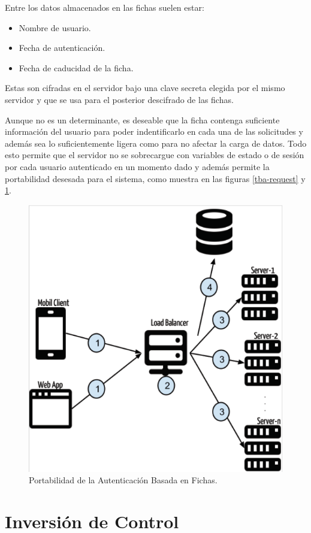     Entre los datos almacenados en las fichas suelen estar:
    
    \begin{itemize}
        \item Nombre de usuario.
        \item Fecha de autenticación.
        \item Fecha de caducidad de la ficha.
    \end{itemize}

    
    Estas son cifradas en el servidor bajo una clave secreta elegida por el mismo servidor y que se usa para el posterior descifrado de las fichas.
    
    Aunque no es un determinante, es deseable que la ficha contenga suficiente información del usuario para poder indentificarlo en cada una de las solicitudes y además sea lo suficientemente ligera como para no afectar la carga de datos. Todo esto permite que el servidor no se sobrecargue con variables de estado o de sesión por cada usuario autenticado en un momento dado y además permite la portabilidad desesada para el sistema, como muestra en las figuras \ref{tba-request} y \ref{tba-server}.
    
    \begin{figure}[htbp!]
        \begin{center}
            \includegraphics[width=.7\textwidth]{figures/tokenbaservers}
        \end{center}
        \caption{Portabilidad de la Autenticación Basada en Fichas.}
        \label{tba-server}
    \end{figure}
    
    \section{Inversión de Control}
    
    
\pagebreak